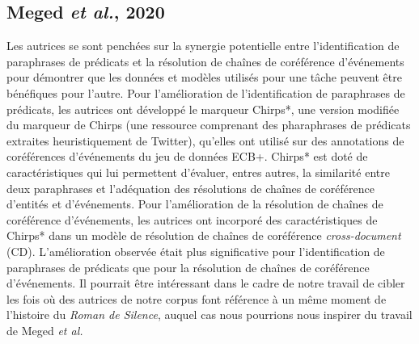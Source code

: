 \documentclass[hidelinks, 11pt, letterpaper]{article}
\begin{document}
\subsection*{Meged \emph{et al.}, 2020}
Les autrices se sont penchées sur la synergie potentielle entre l'identification de paraphrases de prédicats et la résolution de chaînes de coréférence d'événements pour démontrer que les données et modèles utilisés pour une tâche peuvent être bénéfiques pour l'autre. Pour l'amélioration de l'identification de paraphrases de prédicats, les autrices ont développé le marqueur Chirps*, une version modifiée du marqueur de Chirps (une ressource comprenant des pharaphrases de prédicats extraites heuristiquement de Twitter), qu'elles ont utilisé sur des annotations de coréférences d'événements du jeu de données ECB+. Chirps* est doté de caractéristiques qui lui permettent d'évaluer, entres autres, la similarité entre deux paraphrases et l'adéquation des résolutions de chaînes de coréférence d'entités et d'événements. Pour l'amélioration de la résolution de chaînes de coréférence d'événements, les autrices ont incorporé des caractéristiques de Chirps* dans un modèle de résolution de chaînes de coréférence \emph{cross-document} (CD). L'amélioration observée était plus significative pour l'identification de paraphrases de prédicats que pour la résolution de chaînes de coréférence d'événements. Il pourrait être intéressant dans le cadre de notre travail de cibler les fois où des autrices de notre corpus font référence à un même moment de l'histoire du \emph{Roman de Silence}, auquel cas nous pourrions nous inspirer du travail de Meged \emph{et al.}
\end{document}

